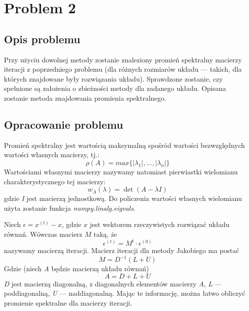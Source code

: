 \documentclass{article}
\begin{document}
\newpage

\section{Problem 2}
\subsection{Opis problemu}
Przy użyciu dowolnej metody zostanie znaleziony promień spektralny macierzy iteracji z poprzedniego problemu
(dla różnych rozmiarów układu --- takich, dla których znajdowane były rozwiązania układu).
Sprawdzone zostanie, czy spełnione są założenia o zbieżności metody dla zadanego układu. Opisana zostanie metoda znajdowania
promienia spektralnego.

\subsection{Opracowanie problemu}
Promień spektralny jest wartością maksymalną spośród wartości bezwzględnych wartości własnych macierzy, tj.:
$$\rho(A)=max\{|\lambda_1|,..., |\lambda_n|\}$$
Wartościami własnymi macierzy nazywamy natomiast pierwiastki wielomianu charakterystycznego tej macierzy:
$$w_{A}(\lambda)=\det({A- \lambda I})$$
gdzie \textit{I} jest macierzą jednostkową. Do policzenia wartości własnych wielomianu użyta zostanie funkcja 
\textit{numpy.linalg.eigvals}.

Niech $\epsilon=x^{(t)}-x$, gdzie $x$ jest wektorem rzeczywistych rozwiązać układu równań. Wówczas macierz $M$ taką, że
$$\epsilon^{(t)}=M^t \cdot \epsilon^{(0)}$$
nazywamy macierzą iteracji.
Macierz iteracji dla metody Jakobiego ma postać
$$M=D^{-1}(L+U)$$
Gdzie (niech \textit{A} będzie macierzą układu równań)
$$A = D + L + U$$
\textit{D} jest macierzą diagonalną, z diagonalnych elementów macierzy \textit{A}, \textit{L} --- poddiagonalną, 
\textit{U} --- naddiagonalną. Mając te informację, można łatwo obliczyć promienie spektralne dla macierzy iteracji.

\newpage
\thispagestyle{empty}
\end{document}
